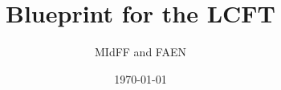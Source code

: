 
\newtheorem{theorem}{Theorem}
\newtheorem{lemma}[theorem]{Lemma}
\newtheorem{proposition}[theorem]{Proposition}

\theoremstyle{definition}
\newtheorem{definition}{Definition}

\date{\today}

\setcounter{tocdepth}{1}

\title{Blueprint for the LCFT}

\author{MIdFF and FAEN}

\newcommand*{\unitball}[1]{{#1}^\circ}
\newcommand*{\ZZ}{\mathbb{Z}}
\newcommand*{\Qp}[1][p]{\mathbb{Q}_{#1}}
\newcommand*{\Fp}[1][p]{\mathbb{F}_{#1}}
\newcommand*{\laurentseries}[1][\Fp]{{#1}(\!(X)\!)}
\newcommand*{\primeid}[1][p]{\mathfrak{#1}}